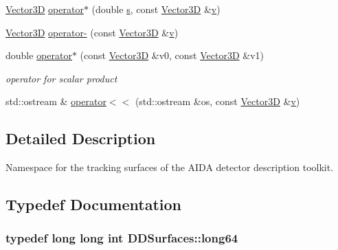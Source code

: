 \begin{DoxyCompactItemize}
\item 
\hyperlink{class_d_d_surfaces_1_1_vector3_d}{Vector3D} \hyperlink{namespace_d_d_surfaces_a6bbc0c2ca88c4b8e2fdcaf98199f4cd8}{operator$\ast$} (double \hyperlink{_volumes_8cpp_a17ca6bfc8040d695d3cada22a4763d40}{s}, const \hyperlink{class_d_d_surfaces_1_1_vector3_d}{Vector3D} \&\hyperlink{_multi_view_8cpp_a8320ee13ac034dbf6d624fe8953dd337}{v})
\item 
\hyperlink{class_d_d_surfaces_1_1_vector3_d}{Vector3D} \hyperlink{namespace_d_d_surfaces_a34c1378c2915634e7266335c283ad07d}{operator-\/} (const \hyperlink{class_d_d_surfaces_1_1_vector3_d}{Vector3D} \&\hyperlink{_multi_view_8cpp_a8320ee13ac034dbf6d624fe8953dd337}{v})
\item 
double \hyperlink{namespace_d_d_surfaces_ac26468a9e0a55f857dd466023fd49e53}{operator$\ast$} (const \hyperlink{class_d_d_surfaces_1_1_vector3_d}{Vector3D} \&v0, const \hyperlink{class_d_d_surfaces_1_1_vector3_d}{Vector3D} \&v1)
\begin{DoxyCompactList}\small\item\em operator for scalar product \item\end{DoxyCompactList}\item 
std::ostream \& \hyperlink{namespace_d_d_surfaces_a7253b384ad158db02712cc561182ce19}{operator$<$$<$} (std::ostream \&os, const \hyperlink{class_d_d_surfaces_1_1_vector3_d}{Vector3D} \&\hyperlink{_multi_view_8cpp_a8320ee13ac034dbf6d624fe8953dd337}{v})
\end{DoxyCompactItemize}


\subsection{Detailed Description}
Namespace for the tracking surfaces of the AIDA detector description toolkit. 

\subsection{Typedef Documentation}
\hypertarget{namespace_d_d_surfaces_ab6b3da366f31f80aec56447ac4442e78}{
\subsubsection[{long64}]{\setlength{\rightskip}{0pt plus 5cm}typedef long long int {\bf DDSurfaces::long64}}}
\label{namespace_d_d_surfaces_ab6b3da366f31f80aec56447ac4442e78}


